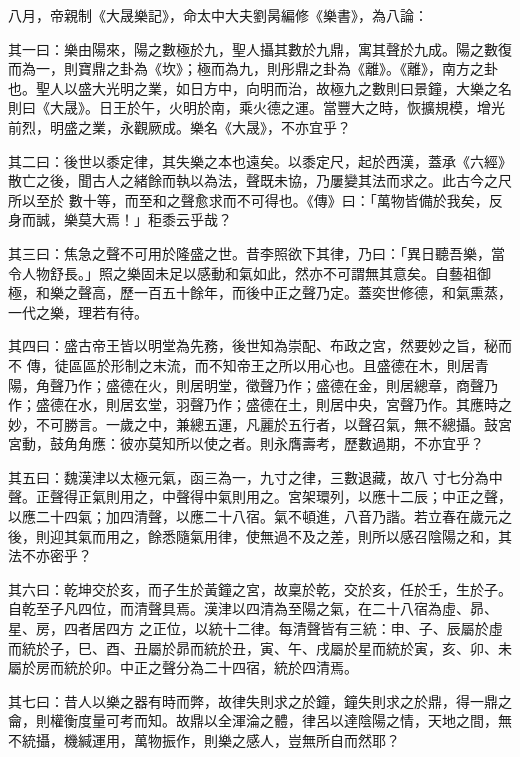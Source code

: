 \begin{pinyinscope}
 八月，帝親制《大晟樂記》，命太中大夫劉昺編修《樂書》，為八論：



 其一曰：樂由陽來，陽之數極於九，聖人攝其數於九鼎，寓其聲於九成。陽之數復
 而為一，則寶鼎之卦為《坎》；極而為九，則彤鼎之卦為《離》。《離》，南方之卦也。聖人以盛大光明之業，如日方中，向明而治，故極九之數則曰景鐘，大樂之名則曰《大晟》。日王於午，火明於南，乘火德之運。當豐大之時，恢擴規模，增光前烈，明盛之業，永觀厥成。樂名《大晟》，不亦宜乎？



 其二曰：後世以黍定律，其失樂之本也遠矣。以黍定尺，起於西漢，蓋承《六經》散亡之後，聞古人之緒餘而執以為法，聲既未協，乃屢變其法而求之。此古今之尺所以至於
 數十等，而至和之聲愈求而不可得也。《傳》曰：「萬物皆備於我矣，反身而誠，樂莫大焉！」秬黍云乎哉？



 其三曰：焦急之聲不可用於隆盛之世。昔李照欲下其律，乃曰：「異日聽吾樂，當令人物舒長。」照之樂固未足以感動和氣如此，然亦不可謂無其意矣。自藝祖御極，和樂之聲高，歷一百五十餘年，而後中正之聲乃定。蓋奕世修德，和氣熏蒸，一代之樂，理若有待。



 其四曰：盛古帝王皆以明堂為先務，後世知為崇配、布政之宮，然要妙之旨，秘而不
 傳，徒區區於形制之末流，而不知帝王之所以用心也。且盛德在木，則居青陽，角聲乃作；盛德在火，則居明堂，徵聲乃作；盛德在金，則居總章，商聲乃作；盛德在水，則居玄堂，羽聲乃作；盛德在土，則居中央，宮聲乃作。其應時之妙，不可勝言。一歲之中，兼總五運，凡麗於五行者，以聲召氣，無不總攝。鼓宮宮動，鼓角角應：彼亦莫知所以使之者。則永膺壽考，歷數過期，不亦宜乎？



 其五曰：魏漢津以太極元氣，函三為一，九寸之律，三數退藏，故八
 寸七分為中聲。正聲得正氣則用之，中聲得中氣則用之。宮架環列，以應十二辰；中正之聲，以應二十四氣；加四清聲，以應二十八宿。氣不頓進，八音乃諧。若立春在歲元之後，則迎其氣而用之，餘悉隨氣用律，使無過不及之差，則所以感召陰陽之和，其法不亦密乎？



 其六曰：乾坤交於亥，而子生於黃鐘之宮，故稟於乾，交於亥，任於壬，生於子。自乾至子凡四位，而清聲具焉。漢津以四清為至陽之氣，在二十八宿為虛、昴、星、房，四者居四方
 之正位，以統十二律。每清聲皆有三統：申、子、辰屬於虛而統於子，巳、酉、丑屬於昴而統於丑，寅、午、戌屬於星而統於寅，亥、卯、未屬於房而統於卯。中正之聲分為二十四宿，統於四清焉。



 其七曰：昔人以樂之器有時而弊，故律失則求之於鐘，鐘失則求之於鼎，得一鼎之龠，則權衡度量可考而知。故鼎以全渾淪之體，律呂以達陰陽之情，天地之間，無不統攝，機緘運用，萬物振作，則樂之感人，豈無所自而然耶？




\end{pinyinscope}
